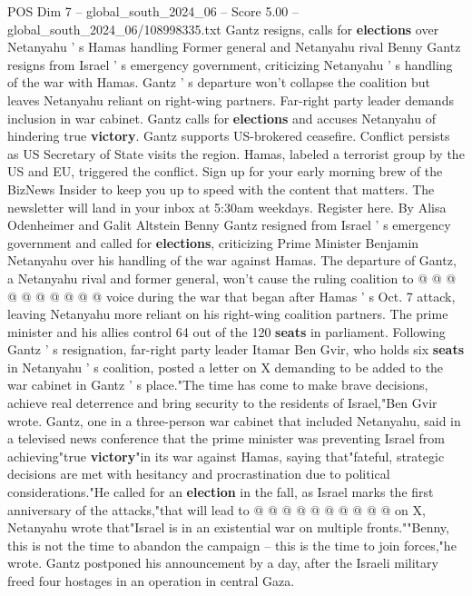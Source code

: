 \begin{textsample}{POS Dim 7 – global\_south\_2024\_06 – Score 5.00 – global\_south\_2024\_06/108998335.txt}  \label{ex:f7_pos_244}
Gantz resigns, calls for \textbf{elections} over Netanyahu ' s Hamas handling Former general and Netanyahu rival Benny Gantz resigns from Israel ' s emergency government, criticizing Netanyahu ' s handling of the war with Hamas.
Gantz ' s departure won't collapse the coalition but leaves Netanyahu reliant on right-wing partners.
Far-right party leader demands inclusion in war cabinet.
Gantz calls for \textbf{elections} and accuses Netanyahu of hindering true \textbf{victory}.
Gantz supports US-brokered ceasefire.
Conflict persists as US Secretary of State visits the region.
Hamas, labeled a terrorist group by the US and EU, triggered the conflict.
Sign up for your early morning brew of the BizNews Insider to keep you up to speed with the content that matters.
The newsletter will land in your inbox at 5:30am weekdays.
Register here.
By Alisa Odenheimer and Galit Altstein Benny Gantz resigned from Israel ' s emergency government and called for \textbf{elections}, criticizing Prime Minister Benjamin Netanyahu over his handling of the war against Hamas.
The departure of Gantz, a Netanyahu rival and former general, won't cause the ruling coalition to @ @ @ @ @ @ @ @ @ @ voice during the war that began after Hamas ' s Oct. 7 attack, leaving Netanyahu more reliant on his right-wing coalition partners.
The prime minister and his allies control 64 out of the 120 \textbf{seats} in parliament.
Following Gantz ' s resignation, far-right party leader Itamar Ben Gvir, who holds six \textbf{seats} in Netanyahu ' s coalition, posted a letter on X demanding to be added to the war cabinet in Gantz ' s place."The time has come to make brave decisions, achieve real deterrence and bring security to the residents of Israel,"Ben Gvir wrote.
Gantz, one in a three-person war cabinet that included Netanyahu, said in a televised news conference that the prime minister was preventing Israel from achieving"true \textbf{victory}"in its war against Hamas, saying that"fateful, strategic decisions are met with hesitancy and procrastination due to political considerations."He called for an \textbf{election} in the fall, as Israel marks the first anniversary of the attacks,"that will lead to @ @ @ @ @ @ @ @ @ @ on X, Netanyahu wrote that"Israel is in an existential war on multiple fronts.""Benny, this is not the time to abandon the campaign -- this is the time to join forces,"he wrote.
Gantz postponed his announcement by a day, after the Israeli military freed four hostages in an operation in central Gaza.

\end{textsample}
